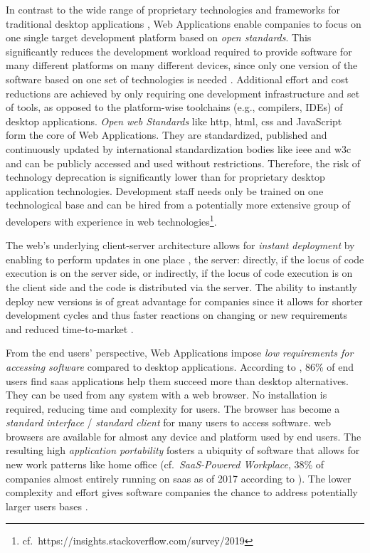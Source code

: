 In contrast to the wide range of proprietary technologies and frameworks for traditional desktop applications \autocite{Puder2004a}, \glspl{Web Application} enable companies to focus on one single target development platform based on \emph{open standards}.
This significantly reduces the development workload required to provide software for many different platforms on many different devices, since only one version of the software based on one set of technologies is needed \autocite{OReilly2007Web2.0}.
Additional effort and cost reductions are achieved by only requiring one development infrastructure and set of tools, as opposed to the platform-wise toolchains (e.g., compilers, IDEs) of desktop applications.
\emph{Open \Gls{web} Standards} like \gls{http}, \gls{html}, \gls{css} and JavaScript form the core of \glspl{Web Application}.
They are standardized, published and continuously updated by international standardization bodies like \gls{ieee} and \gls{w3c} and can be publicly accessed and used without restrictions.
Therefore, the risk of technology deprecation is significantly lower than for proprietary desktop application technologies.
Development staff needs only be trained on one technological base and can be hired from a potentially more extensive group of developers with experience in \Gls{web} technologies\footnote{cf.~https://insights.stackoverflow.com/survey/2019}.

The \Gls{web}'s underlying client-server architecture allows for \emph{instant deployment} by enabling to perform updates in one place \autocite{Gitzel2007WebEngineeringMDD}, the server:
directly, if the locus of code execution is on the server side, or indirectly, if the locus of code execution is on the client side and the code is distributed via the server.
The ability to instantly deploy new versions is of great advantage for companies since it allows for shorter development cycles and thus faster reactions on changing or new requirements and reduced time-to-market \autocite{Khadka2014ProfessionalsModernization,Fowley2017CloudSME}.

From the end users' perspective, \glspl{Web Application} impose \emph{low requirements for accessing software} compared to desktop applications.
According to \autocite{BetterCloud2017SaaSWorkplace}, 86\% of end users find \gls{saas} applications help them succeed more than desktop alternatives.
They can be used from any system with a \Gls{web} browser.
No installation is required, reducing time and complexity for users.
The browser has become a \emph{standard interface} \autocite{Aversano2001} / \emph{standard client} \autocite{Gitzel2007WebEngineeringMDD} for many users to access software.
\Gls{web} browsers are available for almost any device and platform used by end users.
The resulting high \emph{application portability} \autocite{Gitzel2007WebEngineeringMDD} fosters a ubiquity of software that allows for new work patterns like home office \autocite{Bitkom2013Arbeit30} (cf.~\emph{SaaS-Powered Workplace}, 38\% of companies almost entirely running on \gls{saas} as of 2017 according to \autocite{BetterCloud2017SaaSWorkplace}).
The lower complexity and effort gives software companies the chance to address potentially larger users bases \autocite{ForresterResearch2011Modernization}.

